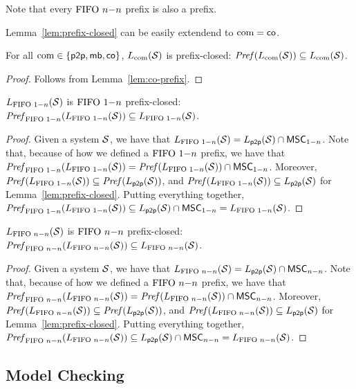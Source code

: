 \noindent Note that every $\nn$ prefix is also a prefix.

\medskip

Lemma~\ref{lem:prefix-closed} can be easily extendend to $\comsymb = \cosymb$.

\begin{lemma}\label{lem:co-prefix-closed}
	For all $\comsymb \in \{\ppsymb, \mbsymb, \cosymb\}$, $\cL{\Sys}$ is prefix-closed:
	$\Pref{\cL{\Sys}} \subseteq \cL{\Sys}$.
\end{lemma}
\begin{proof}
	Follows from Lemma~\ref{lem:co-prefix}.
\end{proof}

\begin{lemma}\label{lem:onen-prefix-closed}
	$\onenL{\Sys}$ is $\onen$ prefix-closed:
	$\Prefonen{\onenL{\Sys}} \subseteq \onenL{\Sys}$.
\end{lemma}
\begin{proof}
	Given a system $\System$, we have that $\onenL{\System} = \ppL{\System} \cap \onenMSCs$. Note that, because of how we defined a $\onen$ prefix, we have that $\Prefonen{\onenL{\Sys}} = \Pref{\onenL{\Sys}} \cap \onenMSCs$. Moreover, $\Pref{\onenL{\Sys}} \subseteq \Pref{\ppL{\Sys}}$, and $\Pref{\onenL{\Sys}} \subseteq \ppL{\Sys}$ for Lemma~\ref{lem:prefix-closed}. Putting everything together, $\Prefonen{\onenL{\Sys}} \subseteq \ppL{\Sys} \cap \onenMSCs = \onenL{\System}$.
\end{proof}

\begin{lemma}\label{lem:nn-prefix-closed}
	$\nnL{\Sys}$ is $\nn$ prefix-closed:
	$\Prefnn{\nnL{\Sys}} \subseteq \nnL{\Sys}$.
\end{lemma}
\begin{proof}
	Given a system $\System$, we have that $\nnL{\System} = \ppL{\System} \cap \nnMSCs$. Note that, because of how we defined a $\nn$ prefix, we have that $\Prefnn{\nnL{\Sys}} = \Pref{\nnL{\Sys}} \cap \nnMSCs$. Moreover, $\Pref{\nnL{\Sys}} \subseteq \Pref{\ppL{\Sys}}$, and $\Pref{\nnL{\Sys}} \subseteq \ppL{\Sys}$ for Lemma~\ref{lem:prefix-closed}. Putting everything together, $\Prefnn{\nnL{\Sys}} \subseteq \ppL{\Sys} \cap \nnMSCs = \nnL{\System}$.
\end{proof}

\subsection{Model Checking}

